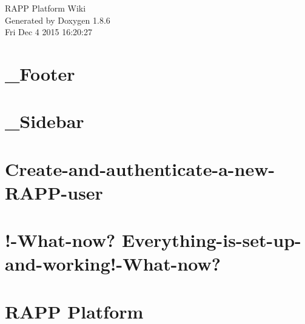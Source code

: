 \documentclass[twoside]{book}
\newcommand{\clearemptydoublepage}{%
  \newpage{\pagestyle{empty}\cleardoublepage}%
}
\begin{document}
\hypersetup{pageanchor=false}
\begin{titlepage}
\vspace*{7cm}
\begin{center}%
{\Large R\-A\-P\-P Platform Wiki }\\
\vspace*{1cm}
{\large Generated by Doxygen 1.8.6}\\
\vspace*{0.5cm}
{\small Fri Dec 4 2015 16:20:27}\\
\end{center}
\end{titlepage}
\clearemptydoublepage
\tableofcontents
\clearemptydoublepage
{}
\hypersetup{pageanchor=true}

\chapter{\-\_\-\-Footer}
\label{md_rapp-platform_8wiki__Footer}
\hypertarget{md_rapp-platform_8wiki__Footer}{}

\chapter{\-\_\-\-Sidebar}
\label{md_rapp-platform_8wiki__Sidebar}
\hypertarget{md_rapp-platform_8wiki__Sidebar}{}

\chapter{Create-\/and-\/authenticate-\/a-\/new-\/\-R\-A\-P\-P-\/user}
\label{md_rapp-platform_8wiki_Create-and-authenticate-a-new-RAPP-user}
\hypertarget{md_rapp-platform_8wiki_Create-and-authenticate-a-new-RAPP-user}{}

\chapter{!-\/\-What-\/now? Everything-\/is-\/set-\/up-\/and-\/working!-\/\-What-\/now?}
\label{md_rapp-platform_8wiki_Everything-is-set-up-and-working}
\hypertarget{md_rapp-platform_8wiki_Everything-is-set-up-and-working}{}

\chapter{R\-A\-P\-P Platform}
\label{md_rapp-platform_8wiki_Home}
\hypertarget{md_rapp-platform_8wiki_Home}{}

\end{document}
